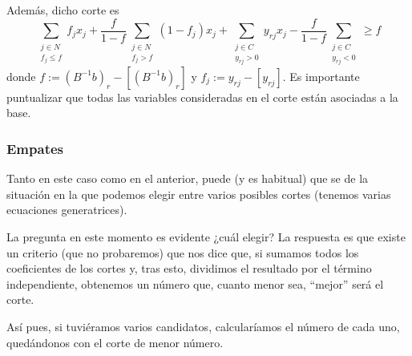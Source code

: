Además, dicho corte es
\begin{equation*}
	\sum_{\substack{j\in N\\f_j\leq f}}f_jx_j+\frac{f}{1-f}\sum_{\substack{j\in N\\f_j> f}}(1-f_j)x_j+\sum_{\substack{j\in C\\y_{rj}> 0}}y_{rj}x_j-\frac{f}{1-f}\sum_{\substack{j\in C\\y_{rj}< 0}}\geq f
\end{equation*}
donde $f:=(B^{-1}b)_r-[(B^{-1}b)_r]$ y $f_j:=y_{rj}-[y_{rj}]$. Es importante puntualizar que todas las variables consideradas en el corte  están asociadas a la base.
\subsubsection{Empates}
Tanto en este caso como en el anterior, puede (y es habitual) que se de la situación en la que podemos elegir entre varios posibles cortes (tenemos varias ecuaciones generatrices).

La pregunta en este momento es evidente ¿cuál elegir? La respuesta es que existe un criterio (que no probaremos) que nos dice que, si sumamos todos los coeficientes de los cortes y, tras esto, dividimos el resultado por el término independiente, obtenemos un número que, cuanto menor sea, ``mejor'' será el corte.

Así pues, si tuviéramos varios candidatos, calcularíamos el número de cada uno, quedándonos con el corte de menor número.